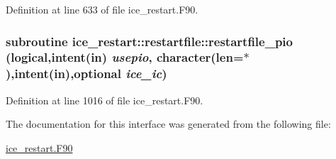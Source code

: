 Definition at line 633 of file ice\_\-restart.F90.\hypertarget{interfaceice__restart_1_1restartfile_a42dfda109a5bae2c4b91a2655ba542e0}{
\subsubsection[{restartfile\_\-pio}]{\setlength{\rightskip}{0pt plus 5cm}subroutine ice\_\-restart::restartfile::restartfile\_\-pio (logical,intent(in) {\em usepio}, \/  character(len=$\ast$),intent(in),optional {\em ice\_\-ic})}}
\label{interfaceice__restart_1_1restartfile_a42dfda109a5bae2c4b91a2655ba542e0}


Definition at line 1016 of file ice\_\-restart.F90.

The documentation for this interface was generated from the following file:\begin{DoxyCompactItemize}
\item 
\hyperlink{ice__restart_8F90}{ice\_\-restart.F90}\end{DoxyCompactItemize}
